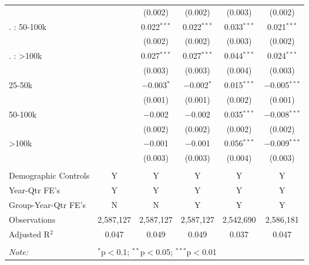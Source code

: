 \begin{table}[!htbp]
\begin{tabular}{@{\extracolsep{5pt}}lccccc}
  &  & (0.002) & (0.002) & (0.003) & (0.002) \\ 
   . : 50-100k &  & 0.022$^{***}$ & 0.022$^{***}$ & 0.033$^{***}$ & 0.021$^{***}$ \\ 
  &  & (0.002) & (0.002) & (0.003) & (0.002) \\ 
   . : >100k &  & 0.027$^{***}$ & 0.027$^{***}$ & 0.044$^{***}$ & 0.024$^{***}$ \\ 
  &  & (0.003) & (0.003) & (0.004) & (0.003) \\ 
  25-50k &  & $-$0.003$^{*}$ & $-$0.002$^{*}$ & 0.015$^{***}$ & $-$0.005$^{***}$ \\ 
  &  & (0.001) & (0.001) & (0.002) & (0.001) \\ 
  50-100k &  & $-$0.002 & $-$0.002 & 0.035$^{***}$ & $-$0.008$^{***}$ \\ 
  &  & (0.002) & (0.002) & (0.002) & (0.002) \\ 
  >100k &  & $-$0.001 & $-$0.001 & 0.056$^{***}$ & $-$0.009$^{***}$ \\ 
  &  & (0.003) & (0.003) & (0.004) & (0.003) \\ 
 \hline \\[-1.8ex] 
Demographic Controls & Y & Y & Y & Y & Y \\ 
Year-Qtr FE's & Y & Y & Y & Y & Y \\ 
Group-Year-Qtr FE's & N & N & Y & Y & Y \\ 
Observations & 2,587,127 & 2,587,127 & 2,587,127 & 2,542,690 & 2,586,181 \\ 
Adjusted R$^{2}$ & 0.047 & 0.049 & 0.049 & 0.037 & 0.047 \\ 
\hline 
\hline \\[-1.8ex] 
\textit{Note:}  & \multicolumn{5}{l}{$^{*}$p$<$0.1; $^{**}$p$<$0.05; $^{***}$p$<$0.01} \\ 
\end{tabular} 
\end{table} 
